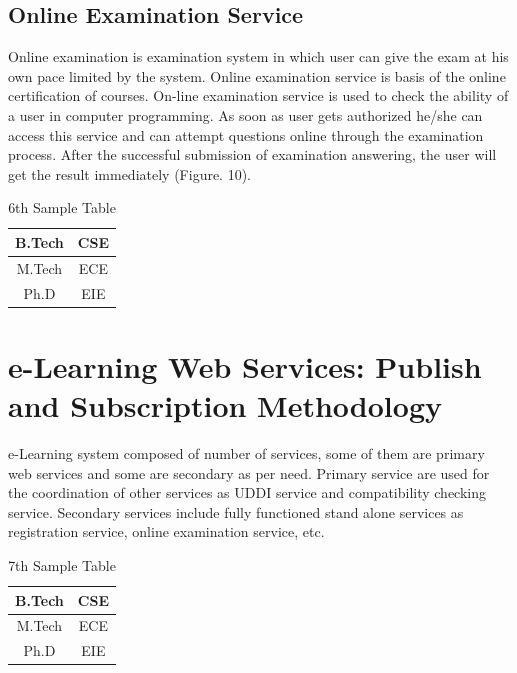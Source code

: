 \subsection{Online Examination Service}
Online examination is examination system in which user can give the exam at his own pace limited by the system.
Online examination service is basis of the online certification of courses. On-line examination service is used to check the ability 
of a user in computer programming. As soon as user gets authorized he/she can access this service and can attempt questions online through the examination
 process. After the successful submission of examination answering, the user will get the result immediately (Figure. 10). 
 
 \begin{table}
 \begin{center}
 \caption{6th Sample Table}
 \begin{tabular}{|c|c|}
 \hline
 B.Tech & CSE\\
 \hline
 M.Tech & ECE\\
 \hline
 Ph.D & EIE\\
 \hline 
 \end{tabular}
 \end{center}
\end{table} 



\section{e-Learning Web Services: Publish and Subscription Methodology}
e-Learning system composed of number of services, some of them are primary web services and some are secondary as per need. Primary 
service are used for the coordination of other services as UDDI service and  compatibility checking service. Secondary services 
include fully functioned stand alone services as registration service, online examination service, etc.

\begin{table}
 \begin{center}
 \caption{7th Sample Table}
 \begin{tabular}{|c|c|}
 \hline
 B.Tech & CSE\\
 \hline
 M.Tech & ECE\\
 \hline
 Ph.D & EIE\\
 \hline 
 \end{tabular}
 \end{center}
\end{table}
